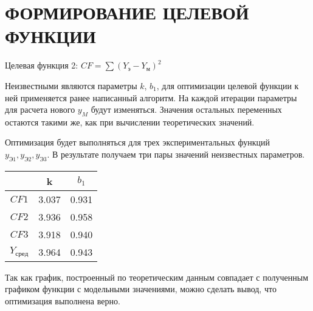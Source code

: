 \part{ФОРМИРОВАНИЕ ЦЕЛЕВОЙ ФУНКЦИИ}
    \begin{center}
        Целевая функция 2: $CF=\sum(Y_{\text{э}} - Y_{\text{м}})^2$
    \end{center}

    Неизвестными являются параметры $k$, $b_1$, для оптимизации целевой функции к ней применяется ранее написанный алгоритм. На каждой итерации параметры для расчета нового $y_M$ будут изменяться. Значения остальных переменных остаются такими же, как при вычислении теоретических значений.

    Оптимизация будет выполняться для трех экспериментальных функций $y_{\text{Э1}}, y_{\text{Э2}}, y_{\text{Э3}}$. В результате получаем три пары значений неизвестных параметров.

    \begin{center}
        \begin{tabular}{c|c|c|}
        \cline{2-3}
                                    & k    & $b_1$  \\ \hline
        \multicolumn{1}{|c|}{$CF1$} & 3.037 & 0.931 \\ \hline
        \multicolumn{1}{|c|}{$CF2$} & 3.936 & 0.958 \\ \hline
        \multicolumn{1}{|c|}{$CF3$} & 3.918 & 0.940  \\ \hline
        \multicolumn{1}{|c|}{$Y_{\text{сред}}$} & 3.964  & 0.943   \\ \hline
        \end{tabular}
    \end{center}

    \begin{center}
    \end{center}

    Так как график, построенный по теоретическим данным совпадает с полученным графиком функции с модельными значениями, можно сделать вывод, что оптимизация выполнена верно.
